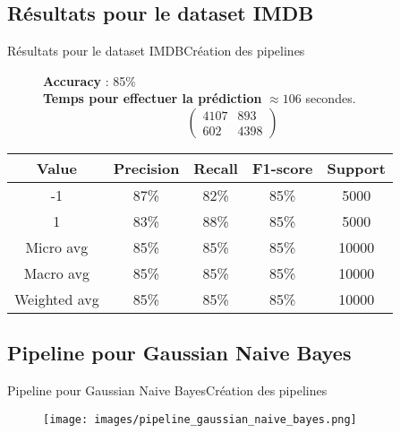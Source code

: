 \documentclass[usenames,dvipsnames]{beamer}
\begin{document}
\subsection{Résultats pour le dataset IMDB}
\begin{frame}{Résultats pour le dataset IMDB}{Création des pipelines}
\begin{figure}[!ht]
  \centering
  \textbf{Accuracy} : 85\% \\
  \textbf{Temps pour effectuer la prédiction} $\approx106$ secondes.
  $$
  \begin{pmatrix}
  4107 & 893 \\
  602 & 4398
  \end{pmatrix}
  $$
\end{figure}

\begin{table}
  \centering
  \begin{tabular}{|c|c|c|c|c|}
    \hline
    \textbf{Value} & \textbf{Precision} & \textbf{Recall} & \textbf{F1-score} & \textbf{Support}\\
    \hline
    \hline
    -1 & 87\% & 82\% & 85\% & 5000\\
    \hline
    1 & 83\% & 88\% & 85\% & 5000\\
    \hline
    Micro avg & 85\% & 85\% & 85\% & 10000\\
    \hline
    Macro avg & 85\% & 85\% & 85\% & 10000\\
    \hline
    Weighted avg & 85\% & 85\% & 85\% & 10000\\
    \hline
  \end{tabular}
\end{table}
\end{frame}

\subsection{Pipeline pour Gaussian Naive Bayes}
\begin{frame}{Pipeline pour Gaussian Naive Bayes}{Création des pipelines}
\begin{figure}[!ht]
  \centering
  \texttt{[image: images/pipeline\_gaussian\_naive\_bayes.png]}
\end{figure}
\end{frame}
\end{document}
